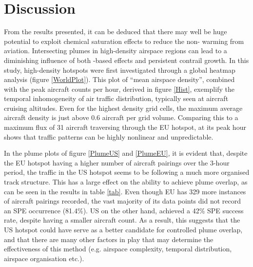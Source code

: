 \section{Discussion}
From the results presented, it can be deduced that there may well be huge potential to exploit chemical saturation effects to reduce the non- warming from aviation. Intersecting plumes in high-density airspace regions can lead to a diminishing influence of both -based effects and persistent contrail growth. In this study, high-density hotspots were first investigated through a global heatmap analysis (figure \ref{WorldPlot}). This plot of ``mean airspace density'', combined with the peak aircraft counts per hour, derived in figure \ref{Hist}, exemplify the temporal inhomogeneity of air traffic distribution, typically seen at aircraft cruising altitudes. Even for the highest density grid cells, the maximum average aircraft density is just above 0.6 aircraft per grid volume. Comparing this to a maximum flux of 31 aircraft traversing through the EU hotspot, at its peak hour shows that traffic patterns can be highly nonlinear and unpredictable.

In the plume plots of figure \ref{PlumeUS} and \ref{PlumeEU}, it is evident that, despite the EU hotspot having a higher number of aircraft pairings over the 3-hour period, the traffic in the US hotspot seems to be following a much more organised track structure. This has a large effect on the ability to achieve plume overlap, as can be seen in the results in table \ref{tab}. Even though EU has 329 more instances of aircraft pairings recorded, the vast majority of its data points did not record an SPE occurrence (81.4\%). US on the other hand, achieved a 42\% SPE success rate, despite having a smaller aircraft count. As a result, this suggests that the US hotspot could have serve as a better candidate for controlled plume overlap, and that there are many other factors in play that may determine the effectiveness of this method (e.g. airspace complexity, temporal distribution, airspace organisation etc.).